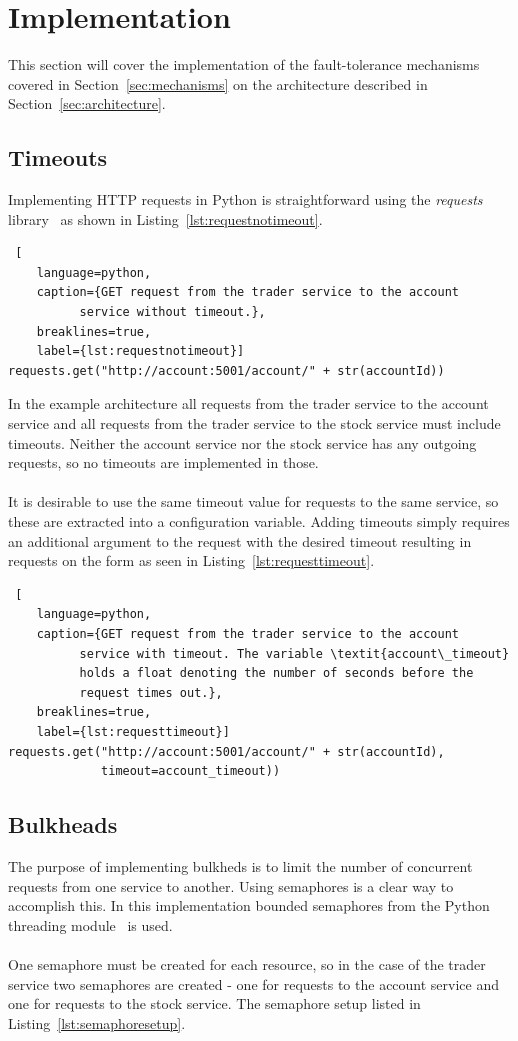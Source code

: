 \section{Implementation}\label{sec:implementation}
This section will cover the implementation of the fault-tolerance mechanisms
covered in Section~\ref{sec:mechanisms} on the architecture described in
Section~\ref{sec:architecture}.

\subsection{Timeouts}
Implementing HTTP requests in Python is straightforward using the
\textit{requests} library~\cite{requests} as shown in
Listing~\ref{lst:requestnotimeout}.

\begin{lstlisting} [
	language=python,
	caption={GET request from the trader service to the account
          service without timeout.},
	breaklines=true,
	label={lst:requestnotimeout}]
requests.get("http://account:5001/account/" + str(accountId))
\end{lstlisting}
In the example architecture all requests from the
trader service to the account service and all requests from the trader
service to the stock service must include timeouts. Neither the
account service nor the stock service has any outgoing requests, so no
timeouts are implemented in those.
\\\\
It is desirable to use the same timeout value for requests to the same
service, so these are extracted into a configuration variable. Adding
timeouts simply requires an additional argument to the request with
the desired timeout resulting in requests on the form as seen in
Listing~\ref{lst:requesttimeout}.

\begin{lstlisting} [
	language=python,
	caption={GET request from the trader service to the account
          service with timeout. The variable \textit{account\_timeout}
          holds a float denoting the number of seconds before the
          request times out.},
	breaklines=true,
	label={lst:requesttimeout}]
requests.get("http://account:5001/account/" + str(accountId),
             timeout=account_timeout))
\end{lstlisting}

\subsection{Bulkheads}
The purpose of implementing bulkheds is to limit the number of
concurrent requests from one service to another. Using semaphores is a
clear way to accomplish this. In this implementation bounded
semaphores from the Python threading module~\cite{pythonthreading} is used.
\\\\
One semaphore must be created for each resource, so in the case of the
trader service two semaphores are created - one for requests to the
account service and one for requests to the stock service. The
semaphore setup listed in Listing~\ref{lst:semaphoresetup}.

